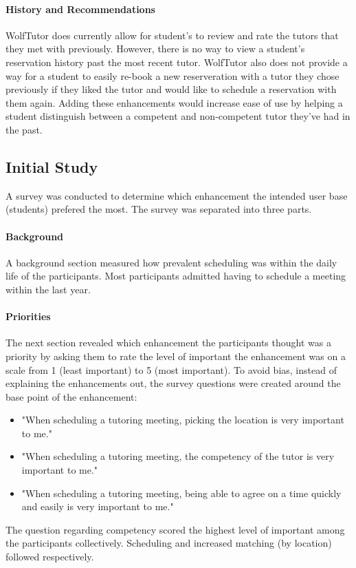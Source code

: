 \paragraph{History and Recommendations} WolfTutor does currently allow
for student's to review and rate the tutors that they met with
previously. However, there is no way to view a student's reservation
history past the most recent tutor. WolfTutor also does not provide a
way for a student to easily re-book a new reserveration with a tutor
they chose previously if they liked the tutor and would like to
schedule a reservation with them again. Adding these enhancements
would increase ease of use by helping a student distinguish between a
competent and non-competent tutor they've had in the past.

\subsection{Initial Study}
\label{sec:initial-study} A survey was conducted to determine which
enhancement the intended user base (students) prefered the most. The
survey was separated into three parts.

\paragraph{Background} A background section measured how prevalent
scheduling was within the daily life of the participants. Most
participants admitted having to schedule a meeting within the last
year.

\paragraph{Priorities} The next section revealed which enhancement the
participants thought was a priority by asking them to rate the level
of important the enhancement was on a scale from 1 (least important)
to 5 (most important). To avoid bias, instead of explaining the
enhancements out, the survey questions were created around the base
point of the enhancement:
\begin{itemize}
  \item "When scheduling a tutoring meeting, picking the location is
very important to me."
  \item "When scheduling a tutoring meeting, the competency of the
tutor is very important to me."
  \item "When scheduling a tutoring meeting, being able to agree on a
time quickly and easily is very important to me."
\end{itemize} The question regarding competency scored the highest
level of important among the participants collectively. Scheduling and
increased matching (by location) followed respectively.


